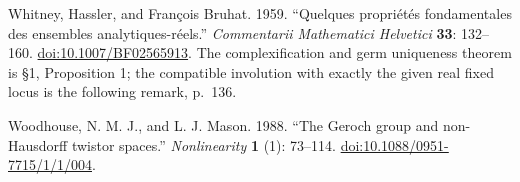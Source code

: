 \documentclass[
  english,
  11pt,
  reqno]{amsart}
\begin{document}
\begin{thebibliography}{}
\protect{}\label{ref:WhitneyBruhat1959}

Whitney, Hassler, and François Bruhat. 1959. ``Quelques propriétés
fondamentales des ensembles analytiques-réels.'' \emph{Commentarii
Mathematici Helvetici} \textbf{33}: 132--160.
\href{https://doi.org/10.1007/BF02565913}{doi:10.1007/BF02565913}. The
complexification and germ uniqueness theorem is §1, Proposition 1; the
compatible involution with exactly the given real fixed locus is the
following remark, p.~136.

\protect{}\label{ref:WoodhouseMason1988}

Woodhouse, N. M. J., and L. J. Mason. 1988. ``The Geroch group and
non-Hausdorff twistor spaces.'' \emph{Nonlinearity} \textbf{1} (1):
73--114.
\href{https://doi.org/10.1088/0951-7715/1/1/004}{doi:10.1088/0951-7715/1/1/004}.

\end{thebibliography}
\endgroup
\end{document}
